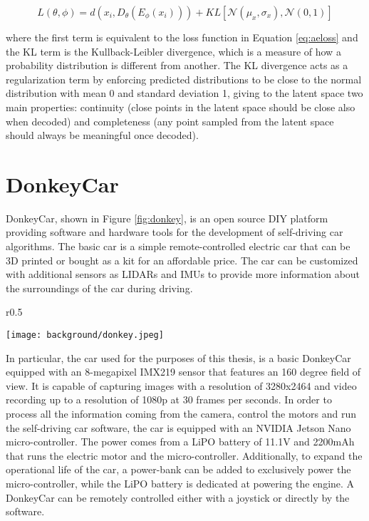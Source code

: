 \begin{equation}
\label{eq:vaeloss}
  L(\theta ,\phi) = d(x_{i},D_{\theta }(E_{\phi }(x_{i}))) + KL[\mathcal{N} (\mu_x, \sigma_x),\mathcal{N}(0, 1)]
\end{equation}

where the first term is equivalent to the loss function in Equation \ref{eq:aeloss} and the KL term is the Kullback-Leibler divergence, which is a measure of how a probability distribution is different from another. The KL divergence acts as a regularization term by enforcing predicted distributions to be close to the normal distribution with mean 0 and standard deviation 1, giving to the latent space two main properties: continuity (close points in the latent space should be close also when decoded) and completeness (any point sampled from the latent space should always be meaningful once decoded). 

\section{DonkeyCar} \label{sec:donkeycar}

DonkeyCar, shown in Figure \ref{fig:donkey}, is an open source DIY platform providing software and hardware tools for the development of self-driving car algorithms. The basic car is a simple remote-controlled electric car that can be 3D printed or bought as a kit for an affordable price. The car can be customized with additional sensors as LIDARs and IMUs to provide more information about the surroundings of the car during driving.

\begin{wrapfigure}[19]{r}{0.5\textwidth}
  \begin{center}
    \texttt{[image: background/donkey.jpeg]}
  \end{center}
  \caption{Assembled DonkeyCar}
  \label{fig:donkey}
\end{wrapfigure}

In particular, the car used for the purposes of this thesis, is a basic DonkeyCar equipped with an 8-megapixel IMX219 sensor that features an 160 degree field of view. It is capable of capturing images with a resolution of 3280x2464 and video recording up to a resolution of 1080p at 30 frames per seconds. In order to process all the information coming from the camera, control the motors and run the self-driving car software, the car is equipped with an NVIDIA Jetson Nano micro-controller. The power comes from a LiPO battery of 11.1V and 2200mAh that runs the electric motor and the micro-controller. Additionally, to expand the operational life of the car, a power-bank can be added to exclusively power the micro-controller, while the LiPO battery is dedicated at powering the engine. 
A DonkeyCar can be remotely controlled either with a joystick or directly by the software.